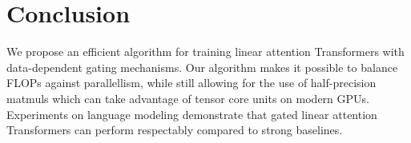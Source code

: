 \vspace{-2mm}
\section{Conclusion}
\vspace{-2mm}
We propose an efficient algorithm for training linear attention Transformers with data-dependent gating mechanisms. Our algorithm makes it possible to balance FLOPs against parallellism, while still allowing for the use of half-precision matmuls which can take advantage of tensor core units on modern GPUs. Experiments on language modeling demonstrate that gated linear attention Transformers can perform respectably compared to strong baselines.
\label{sec:conc}

%
%

